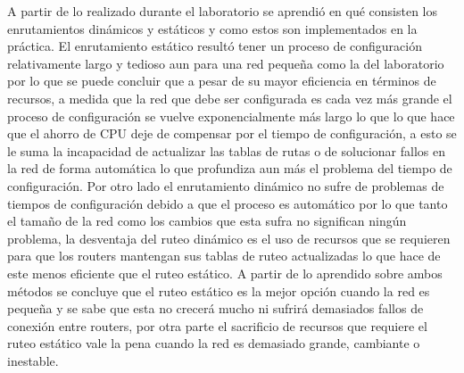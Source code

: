 \documentclass[spanish]{udpreport}
\begin{document}
 A partir de lo realizado durante el laboratorio se aprendió en qué consisten los enrutamientos dinámicos y estáticos y como estos son implementados en la práctica. El enrutamiento estático resultó tener un proceso de configuración relativamente largo y tedioso aun para una red pequeña como la del laboratorio por lo que se puede concluir que a pesar de su mayor eficiencia en términos de recursos, a medida que la red que debe ser configurada es cada vez más grande el proceso de configuración se vuelve exponencialmente más largo lo que lo que hace que el ahorro de CPU deje de compensar por el tiempo de configuración, a esto se le suma la incapacidad de actualizar las tablas de rutas o de solucionar fallos en la red de forma automática lo que profundiza aun más el problema del tiempo de configuración. Por otro lado el enrutamiento dinámico no sufre de problemas de tiempos de configuración debido a que el proceso es automático por lo que tanto el tamaño de la red como los cambios que esta sufra no significan ningún problema, la desventaja del ruteo dinámico es el uso de recursos que se requieren para que los routers mantengan sus tablas de ruteo actualizadas lo que hace de este menos eficiente que el ruteo estático. A partir de lo aprendido sobre ambos métodos se concluye que el ruteo estático es la mejor opción cuando la red es pequeña y se sabe que esta no crecerá mucho ni sufrirá demasiados fallos de conexión entre routers, por otra parte el sacrificio de recursos que requiere el ruteo estático vale la pena cuando la red es demasiado grande, cambiante o inestable.



\listoffigures
\end{document}
